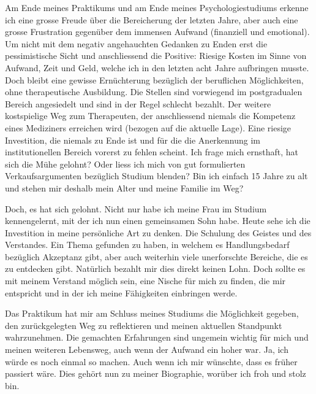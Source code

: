 Am Ende meines Praktikums und am Ende meines Psychologiestudiums erkenne ich eine grosse Freude über die Bereicherung der letzten Jahre, aber auch eine grosse Frustration gegenüber dem immensen Aufwand (finanziell und emotional). Um nicht mit dem negativ angehauchten Gedanken zu Enden erst die pessimistische Sicht und anschliessend die Positive: Riesige Kosten im Sinne von Aufwand, Zeit und Geld, welche ich in den letzten acht Jahre aufbringen musste. Doch bleibt eine gewisse Ernüchterung bezüglich der beruflichen Möglichkeiten, ohne therapeutische Ausbildung. Die Stellen sind vorwiegend im postgradualen Bereich angesiedelt und sind in der Regel schlecht bezahlt. Der weitere kostspielige Weg zum Therapeuten, der anschliessend niemals die Kompetenz eines Mediziners erreichen wird (bezogen auf die aktuelle Lage). Eine riesige Investition, die niemals zu Ende ist und für die die Anerkennung im institutionellen Bereich vorerst zu fehlen scheint. Ich frage mich ernsthaft, hat sich die Mühe gelohnt? Oder liess ich mich von gut formulierten Verkaufsargumenten bezüglich Studium blenden? Bin ich einfach 15 Jahre zu alt und stehen mir deshalb mein Alter und meine Familie im Weg? 

Doch, es hat sich gelohnt. Nicht nur habe ich meine Frau im Studium kennengelernt, mit der ich nun einen gemeinsamen Sohn habe. Heute sehe ich die Investition in meine persönliche Art zu denken. Die Schulung des Geistes und des Verstandes. Ein Thema gefunden zu haben, in welchem es Handlungsbedarf bezüglich Akzeptanz gibt, aber auch weiterhin viele unerforschte Bereiche, die es zu entdecken gibt. Natürlich bezahlt mir dies direkt keinen Lohn. Doch sollte es mit meinem Verstand möglich sein, eine Nische für mich zu finden, die mir entspricht und in der ich meine Fähigkeiten einbringen werde. 

Das Praktikum hat mir am Schluss meines Studiums die Möglichkeit gegeben, den zurückgelegten Weg zu reflektieren und meinen aktuellen Standpunkt wahrzunehmen. Die gemachten Erfahrungen sind ungemein wichtig für mich und meinen weiteren Lebensweg, auch wenn der Aufwand ein hoher war. Ja, ich würde es noch einmal so machen. Auch wenn ich mir wünschte, dass es früher passiert wäre. Dies gehört nun zu meiner Biographie, worüber ich froh und stolz bin.

